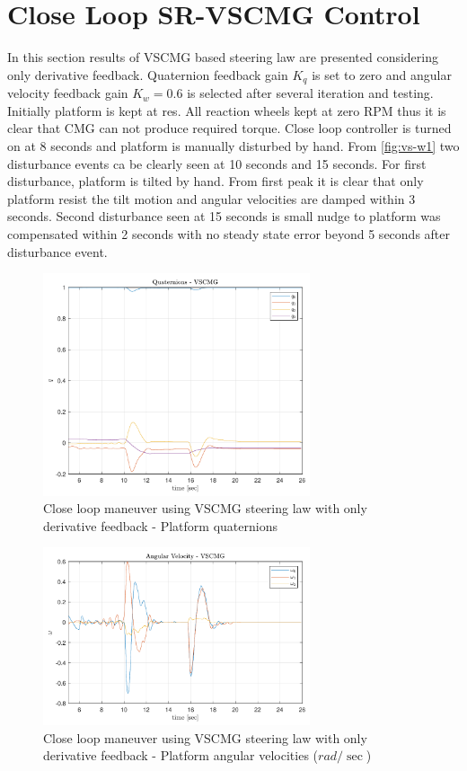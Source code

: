 \section{Close Loop SR-VSCMG Control}
In this section results of VSCMG based steering law are presented considering only derivative feedback. Quaternion feedback gain $K_q$ is set to zero and angular velocity feedback gain $K_w = 0.6$ is selected after several iteration and testing. Initially platform is kept at res. All reaction wheels kept at zero RPM thus it is clear that CMG can not produce required torque. Close loop controller is turned on at 8 seconds and platform is manually disturbed by hand. From \autoref{fig:vs-w1} two disturbance events ca be clearly seen at 10 seconds and 15 seconds. For first disturbance, platform is tilted by hand. From first peak it is clear that only platform resist the tilt motion and angular velocities are damped within 3 seconds. Second disturbance seen at 15 seconds is small nudge to platform was compensated within 2 seconds with no steady state error beyond 5 seconds after disturbance event. 
\begin{figure}[ht]
    \centering
    \includegraphics[width=0.7\textwidth]{figures/plots/exp/vs-q1.pdf}
    \caption{Close loop maneuver using VSCMG steering law with only derivative feedback - Platform quaternions}
    \label{fig:vs-q1}
\end{figure}
\begin{figure}[ht]
    \centering
    \includegraphics[width=0.7\textwidth]{figures/plots/exp/vs-w1.pdf}
    \caption{Close loop maneuver using VSCMG steering law with only derivative feedback - Platform angular velocities ($rad / \sec$)}
    \label{fig:vs-w1}
\end{figure}
